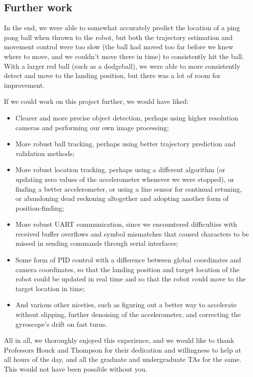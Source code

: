 \documentclass[letterpaper, 11pt]{article}
\begin{document}
\begin{enumerate}[label=\textbf{\arabic*.}]
\clearpage
\section{Further work}
In the end, we were able to somewhat accurately predict the location of a ping pong ball when thrown to the robot, but both the trajectory estimation and movement control were too slow (the ball had moved too far before we knew where to move, and we couldn't move there in time) to consistently hit the ball. With a larger red ball (such as a dodgeball), we were able to more consistently detect and move to the landing position, but there was a lot of room for improvement.

If we could work on this project further, we would have liked:
\begin{itemize}
    \item Clearer and more precise object detection, perhaps using higher resolution cameras and performing our own image processing;
    \item More robust ball tracking, perhaps using better trajectory prediction and validation methods;
    \item More robust location tracking, perhaps using a different algorithm (or updating zero values of the accelerometer whenever we were stopped), or finding a better accelerometer, or using a line sensor for continual retuning, or abandoning dead reckoning altogether and adopting another form of position-finding;
    \item More robust UART communication, since we encountered difficulties with received buffer overflows and symbol mismatches that caused characters to be missed in sending commands through serial interfaces;
    \item Some form of PID control with a difference between global coordinates and camera coordinates, so that the landing position and target location of the robot could be updated in real time and so that the robot could move to the target location in time;
    \item And various other niceties, such as figuring out a better way to accelerate without slipping, further denoising of the accelerometer, and correcting the gyroscope's drift on fast turns.
\end{itemize}
All in all, we thoroughly enjoyed this experience, and we would like to thank Professors Houck and Thompson for their dedication and willingness to help at all hours of the day, and all the graduate and undergraduate TAs for the same. This would not have been possible without you.


\end{enumerate}
\end{document}
